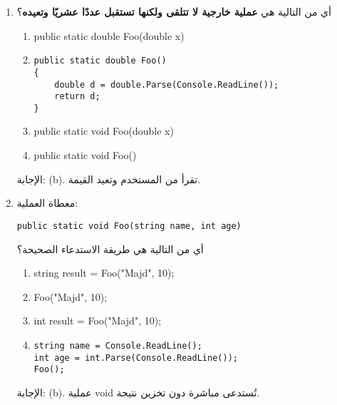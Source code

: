 \documentclass[14pt]{extarticle}
\begin{document}
\begin{enumerate}[itemsep=1.8em]

\clearpage
\item
أي من التالية هي \textbf{عملية خارجية لا تتلقى ولكنها تستقبل عددًا عشريًا وتعيده}؟
\begin{english}
\begin{enumerate}[label=(\alph*)]
    \item public static double Foo(double x)
    \item \begin{verbatim}
public static double Foo()
{
    double d = double.Parse(Console.ReadLine());
    return d;
}
\end{verbatim}
    \item public static void Foo(double x)
    \item public static void Foo()
\end{enumerate}
\end{english}
\ifwithsols
\begin{boxSolution}
الإجابة: (b).
تقرأ من المستخدم وتعيد القيمة.
\end{boxSolution}
\fi


\item
معطاة العملية:
\begin{english}
\begin{verbatim}
public static void Foo(string name, int age)
\end{verbatim}
\end{english}
أي من التالية هي طريقة الاستدعاء الصحيحة؟
\begin{english}
\begin{enumerate}[label=(\alph*)]
    \item string result = Foo("Majd", 10);
    \item Foo("Majd", 10);
    \item int result = Foo("Majd", 10);
    \item \begin{verbatim}
string name = Console.ReadLine();
int age = int.Parse(Console.ReadLine());
Foo();
\end{verbatim}
\end{enumerate}
\end{english}
\ifwithsols
\begin{boxSolution}
الإجابة: (b).
عملية void تُستدعى مباشرة دون تخزين نتيجة.
\end{boxSolution}
\fi



\end{enumerate}
\end{document}
